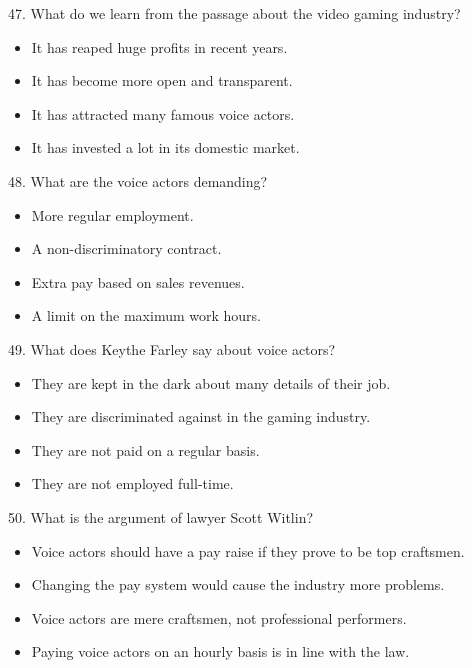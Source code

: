 \documentclass[UTF8,11pt]{ctexart}
\begin{document}
47. What do we learn from the passage about the video gaming industry?


\begin{itemize}[leftmargin=2em,itemsep=.2em,topsep=.4em]\item[A.] It has reaped huge profits in recent years.
\item[B.] It has become more open and transparent.
\item[C.] It has attracted many famous voice actors.
\item[D.] It has invested a lot in its domestic market.
\end{itemize}

48. What are the voice actors demanding?


\begin{itemize}[leftmargin=2em,itemsep=.2em,topsep=.4em]\item[A.] More regular employment.
\item[B.] A non-discriminatory contract.
\item[C.] Extra pay based on sales revenues.
\item[D.] A limit on the maximum work hours.
\end{itemize}

49. What does Keythe Farley say about voice actors?


\begin{itemize}[leftmargin=2em,itemsep=.2em,topsep=.4em]\item[A.] They are kept in the dark about many details of their job.
\item[B.] They are discriminated against in the gaming industry.
\item[C.] They are not paid on a regular basis.
\item[D.] They are not employed full-time.
\end{itemize}

50. What is the argument of lawyer Scott Witlin?


\begin{itemize}[leftmargin=2em,itemsep=.2em,topsep=.4em]\item[A.] Voice actors should have a pay raise if they prove to be top craftsmen.
\item[B.] Changing the pay system would cause the industry more problems.
\item[C.] Voice actors are mere craftsmen, not professional performers.
\item[D.] Paying voice actors on an hourly basis is in line with the law.
\end{itemize}
\end{document}
